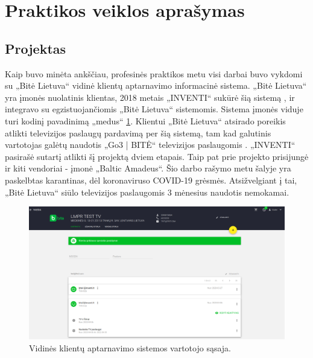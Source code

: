 \section{Praktikos veiklos aprašymas}

\subsection{Projektas}
Kaip buvo minėta ankščiau, profesinės praktikos metu visi darbai buvo vykdomi su „Bitė Lietuva“ vidinė klientų aptarnavimo informacinė sistema.
„Bitė Lietuva“ yra įmonės nuolatinis klientas, 2018 metais „INVENTI“ sukūrė šią sistemą \cite{medus}, ir integravo su egzistuojančiomis „Bitė Lietuva“ sistemomis.
Sistema įmonės viduje turi kodinį pavadinimą „medus“ \ref{img:medus}.
Klientui „Bitė Lietuva“ atsirado poreikis atlikti televizijos paslaugų pardavimą per šią sistemą, tam kad galutinis vartotojas galėtų naudotis
„Go3 | BITĖ“ televizijos paslaugomis \cite{go3}. „INVENTI“ pasirašė sutartį atlikti šį projektą dviem etapais.
Taip pat prie projekto prisijungė ir kiti vendoriai - įmonė „Baltic Amadeus“. Šio darbo rašymo metu šalyje yra paskelbtas karantinas, dėl koronaviruso
COVID-19 grėsmės. Atsižvelgiant į tai, „Bitė Lietuva“ siūlo televizijos paslaugomis 3 mėnesius naudotis nemokamai.


\begin{figure}[H]
    \centering
    \includegraphics[scale=0.25]{img/medus.png}
    \caption{Vidinės klientų aptarnavimo sistemos vartotojo sąsaja.}
    \label{img:medus}
\end{figure}

